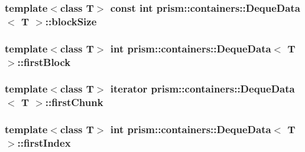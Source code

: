 \subsubsection[{\texorpdfstring{block\+Size}{blockSize}}]{\setlength{\rightskip}{0pt plus 5cm}template$<$class T$>$ const int {\bf prism\+::containers\+::\+Deque\+Data}$<$ T $>$\+::block\+Size}\hypertarget{structprism_1_1containers_1_1_deque_data_aa2a0df06a41e01942111238c8565e4df}{}\label{structprism_1_1containers_1_1_deque_data_aa2a0df06a41e01942111238c8565e4df}
\subsubsection[{\texorpdfstring{first\+Block}{firstBlock}}]{\setlength{\rightskip}{0pt plus 5cm}template$<$class T$>$ int {\bf prism\+::containers\+::\+Deque\+Data}$<$ T $>$\+::first\+Block}\hypertarget{structprism_1_1containers_1_1_deque_data_aa4a6f7338647fcb521e03cec6ac3d49f}{}\label{structprism_1_1containers_1_1_deque_data_aa4a6f7338647fcb521e03cec6ac3d49f}
\subsubsection[{\texorpdfstring{first\+Chunk}{firstChunk}}]{\setlength{\rightskip}{0pt plus 5cm}template$<$class T$>$ {\bf iterator} {\bf prism\+::containers\+::\+Deque\+Data}$<$ T $>$\+::first\+Chunk}\hypertarget{structprism_1_1containers_1_1_deque_data_a20b372c923c7c2597f4a497435d34b42}{}\label{structprism_1_1containers_1_1_deque_data_a20b372c923c7c2597f4a497435d34b42}
\subsubsection[{\texorpdfstring{first\+Index}{firstIndex}}]{\setlength{\rightskip}{0pt plus 5cm}template$<$class T$>$ int {\bf prism\+::containers\+::\+Deque\+Data}$<$ T $>$\+::first\+Index}\hypertarget{structprism_1_1containers_1_1_deque_data_abcaa9b410d36d9d02685d94b694637c2}{}\label{structprism_1_1containers_1_1_deque_data_abcaa9b410d36d9d02685d94b694637c2}
